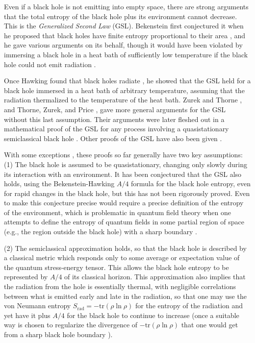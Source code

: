 \documentclass[12pt]{article} \usepackage{latexsym}
\begin{document}
Even if a black hole is not emitting into empty space, there are
strong arguments that the total entropy of the black hole plus its
environment cannot decrease.  This is the {\it Generalized Second Law}
(GSL).  Bekenstein first conjectured it when he proposed that black
holes have finite entropy proportional to their area
\cite{Bek1,Bek2,Bek3,Bek4}, and he gave various arguments on its
behalf, though it would have been violated by immersing a black hole
in a heat bath of sufficiently low temperature if the black hole could
not emit radiation \cite{BCH}.

Once Hawking found that black holes radiate \cite{Haw1,Haw2}, he
showed that the GSL held for a black hole immersed in a heat bath of
arbitrary temperature, assuming that the radiation thermalized to the
temperature of the heat bath.  Zurek and Thorne \cite{ZT}, and Thorne,
Zurek, and Price \cite{TZP}, gave more general arguments for the GSL
without this last assumption.  Their arguments were later fleshed out
in a mathematical proof of the GSL for any process involving a
quasistationary semiclassical black hole \cite{FP}.  Other proofs of
the GSL have also been given \cite{Sor1,Sor2,Waldbook,Sor3}.

With some exceptions \cite{Sor2,Sor3}, these proofs so far generally
have two key assumptions: (1) The black hole is assumed to be
quasistationary, changing only slowly during its interaction with an
environment.  It has been conjectured \cite{TZP} that the GSL also
holds, using the Bekenstein-Hawking $A/4$ formula for the black hole
entropy, even for rapid changes in the black hole, but this has not
been rigorously proved.  Even to make this conjecture precise would
require a precise definition of the entropy of the environment, which
is problematic in quantum field theory when one attempts to define the
entropy of quantum fields in some partial region of space (e.g., the
region outside the black hole) with a sharp boundary \cite{BKLS,Sred}.

(2) The semiclassical approximation holds, so that the black hole is
described by a classical metric which responds only to some average or
expectation value of the quantum stress-energy tensor.  This allows
the black hole entropy to be represented by $A/4$ of its classical
horizon.  This approximation also implies that the radiation from the
hole is essentially thermal, with negligible correlations between what
is emitted early and late in the radiation, so that one may use the
von Neumann entropy $S_{\mathrm{rad}} = -{\mathrm{tr}}(\rho\ln\rho)$
for the entropy of the radiation and yet have it plus $A/4$ for the
black hole to continue to increase (once a suitable way is chosen to
regularize the divergence of $-{\mathrm{tr}}(\rho\ln\rho)$ that one
would get from a sharp black hole boundary \cite{BKLS,Sred}).
\end{document}
